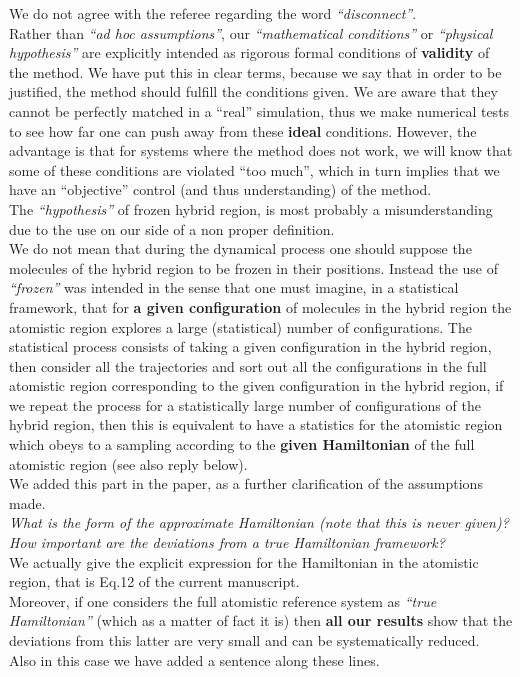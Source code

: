 \documentclass[12pt,a4paper]{article}
\begin{document}
We do not agree with the referee regarding the word {\it ``disconnect''}.\\
Rather than {\it ``ad hoc assumptions''}, our {\it ``mathematical conditions''} or {\it ``physical hypothesis''}
are explicitly intended as rigorous formal conditions of {\bf validity} of the method. We have put this in clear terms, because we say that in order to be justified,
the method should fulfill the conditions given. We are aware that they cannot be perfectly matched in a ``real'' simulation, thus we make numerical tests to see how far one can push away from these {\bf ideal} conditions.
However, the advantage is that for systems where the method does not work, we will know that some of these conditions are violated ``too much'', which in turn implies that we have an ``objective'' control (and thus understanding) of the method.\\
The {\it ``hypothesis''} of frozen hybrid region, is most probably a misunderstanding due to the use on our side of a non proper definition.\\
We do not mean that during the dynamical process one should suppose the molecules of the hybrid region to be frozen in their positions. Instead the use of {\it ``frozen''} was intended in the sense that one must imagine, in a statistical framework, that for {\bf a given configuration} of molecules in the hybrid region the atomistic region explores a large (statistical) number of configurations. The statistical process consists of taking a given configuration in the hybrid region, then consider all the trajectories and sort out all the configurations in the full atomistic region corresponding to the given configuration in the hybrid region, if we repeat the process for a statistically large number of configurations of the hybrid region, then this is equivalent to have a statistics for the atomistic region which obeys to a sampling according to the {\bf given Hamiltonian} of the full atomistic region (see also reply below).\\
We added this part in the paper, as a further clarification of the assumptions made.\\

{\color{teal} {\it What is the form of the approximate Hamiltonian (note that
this is never given)? How important are the deviations from a true Hamiltonian framework?}}\\

We actually give the explicit expression for the Hamiltonian in the atomistic region,
that is Eq.12 of the current manuscript.\\
Moreover, if one considers the full atomistic reference system as {\it ``true Hamiltonian''} (which as a matter of fact it is) then {\bf all our results} show that the deviations from this latter are very small and 
can be systematically reduced.\\
Also in this case we have added a sentence along these lines.\\
\end{document}

